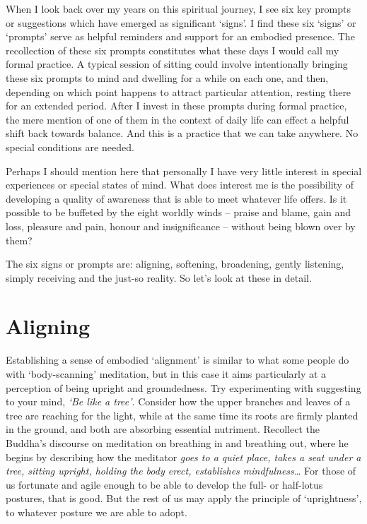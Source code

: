 When I look back over my years on this spiritual journey, I see six key
prompts or suggestions which have emerged as significant ‘signs’. I find
these six ‘signs’ or ‘prompts’ serve as helpful reminders and support
for an embodied presence. The recollection of these six prompts
constitutes what these days I would call my formal practice. A typical
session of sitting could involve intentionally bringing these six
prompts to mind and dwelling for a while on each one, and then,
depending on which point happens to attract particular attention,
resting there for an extended period. After I invest in these prompts
during formal practice, the mere mention of one of them in the context
of daily life can effect a helpful shift back towards balance. And this
is a practice that we can take anywhere. No special conditions are
needed.

Perhaps I should mention here that personally I have very little
interest in special experiences or special states of mind. What does
interest me is the possibility of developing a quality of awareness that
is able to meet whatever life offers. Is it possible to be buffeted by
the eight worldly winds\cite{worldly-dhammas}
 – praise and blame, gain and loss, pleasure
and pain, honour and insignificance – without being blown over by them?

The six signs or prompts are: aligning, softening, broadening, gently
listening, simply receiving and the just-so reality. So let’s look at
these in detail.

\section{Aligning}

Establishing a sense of embodied ‘alignment’ is similar to what some
people do with ‘body-scanning’ meditation, but in this case it aims
particularly at a perception of being upright and groundedness. Try
experimenting with suggesting to your mind, \emph{‘Be like a tree’}. Consider
how the upper branches and leaves of a tree are reaching for the
light, while at the same time its roots are firmly planted in the
ground, and both are absorbing essential nutriment. Recollect the
Buddha’s discourse on meditation on breathing in and breathing
out,\cite{anapanasati}
where he begins by describing how the meditator \emph{goes to a quiet place,
takes a seat under a tree, sitting upright, holding the body erect,
establishes mindfulness…​} For those of us fortunate and agile enough
to be able to develop the full- or half-lotus postures, that is good.
But the rest of us may apply the principle of ‘uprightness’, to whatever
posture we are able to adopt.

